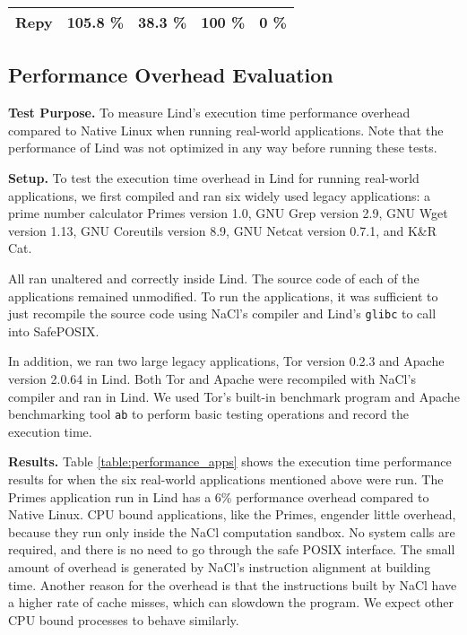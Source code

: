 {{\begin{table}
\begin{tabular}{|l|l|l|l|l|}
  Repy & 105.8 \% & 38.3 \% & 100 \%  & 0 \%  \\
  \hline
\end{tabular}
\label{table:trace-Repy}
\end{table}


\subsection{Performance Overhead Evaluation}
\label{Performance-Evaluation}

\textbf{Test Purpose.}
To measure Lind's execution time performance overhead compared to Native Linux
 when running real-world applications.
Note that the performance of Lind was not optimized in any way before running
these tests.

\noindent
\textbf{Setup.}
To test the execution time overhead in Lind for running real-world applications,
we first compiled and ran six widely used legacy applications:
a prime number calculator Primes version 1.0,
GNU Grep version 2.9, GNU Wget version 1.13, GNU Coreutils version 8.9,
GNU Netcat version 0.7.1, and K\&R Cat.

All ran unaltered and correctly inside Lind. The source code of each of the applications remained
unmodified. To run the applications, it was sufficient to just recompile the
source code using NaCl's compiler and Lind's \texttt{glibc} to call
into SafePOSIX.

In addition, we ran two large legacy applications, Tor version 0.2.3 and Apache version 2.0.64 in Lind.
Both Tor and Apache were recompiled with NaCl's compiler and ran in Lind.
We used Tor's built-in benchmark program and Apache benchmarking tool \texttt{ab} to perform
basic testing operations and record the execution time.

\noindent
\textbf{Results.}
Table \ref{table:performance_apps} shows the execution time performance
results for when the six real-world applications mentioned above were run.
The Primes application run in Lind has a 6\% performance overhead compared to
Native Linux. CPU bound applications, like the Primes, engender little overhead,
because they run only inside the NaCl computation sandbox. No system calls are required,
and there is no need to go through the safe POSIX interface. The small amount of overhead
is generated by NaCl's instruction alignment at building time. Another reason for the overhead
is that the instructions built by NaCl have a higher rate of cache misses, which can slowdown the
program. We expect other CPU bound processes to behave similarly.

}}
